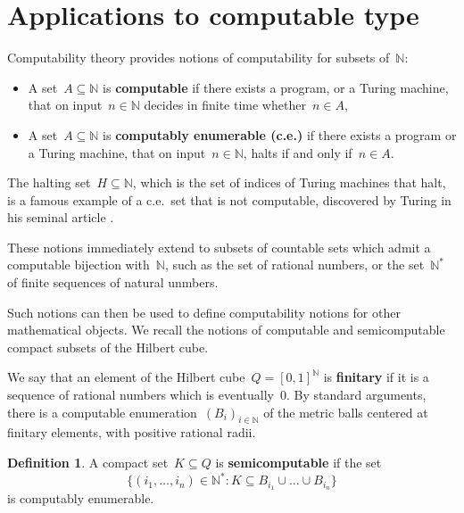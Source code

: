 \documentclass[english,11pt]{article}
\theoremstyle{plain}
\theoremstyle{remark}
\theoremstyle{definition}
\newtheorem{definition}{Definition}[section]
\newcommand{\N}{\mathbb{N}}
\begin{document}
\section{Applications to computable type}\label{sec_computable_type}

Computability theory provides notions of computability for subsets of~$\N$:
\begin{itemize}
\item A set~$A\subseteq\N$ is \textbf{computable} if there exists a program, or a Turing machine, that on input~$n\in\N$ decides in finite time whether~$n\in A$,
\item A set~$A\subseteq\N$ is \textbf{computably enumerable (c.e.)} if there exists a program or a Turing machine, that on input~$n\in\N$, halts if and only if~$n\in A$.
\end{itemize}
The halting set~$H\subseteq\N$, which is the set of indices of Turing machines that halt, is a famous example of a c.e.~set that is not computable, discovered by Turing in his seminal article \cite{Turing36}.


These notions immediately extend to subsets of countable sets which admit a computable bijection with~$\N$, such as the set of rational numbers, or the set~$\N^*$ of finite sequences of natural unmbers.

Such notions can then be used to define computability notions for other mathematical objects. We recall the notions of computable and semicomputable compact subsets of the Hilbert cube.

We say that an element of the Hilbert cube~$Q=[0,1]^\N$ is \textbf{finitary} if it is a sequence of rational numbers which is eventually~$0$. By standard arguments, there is a computable enumeration~$(B_i)_{i\in\N}$ of the metric balls centered at finitary elements, with positive rational radii.


\begin{definition}
A compact set~$K\subseteq Q$ is \textbf{semicomputable} if the set
\begin{equation*}
\{(i_1,\ldots,i_n)\in\N^*:K\subseteq B_{i_1}\cup \ldots\cup B_{i_n}\}
\end{equation*}
is computably enumerable.
\end{definition}
\end{document}
